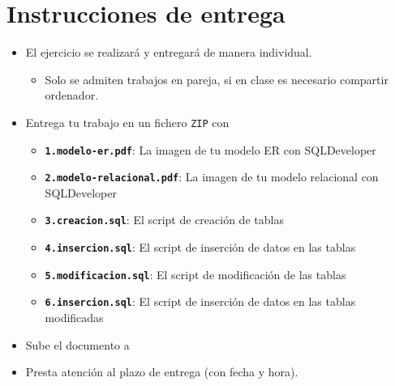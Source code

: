 \section{Instrucciones de entrega}
\begin{itemize}
\item El ejercicio se realizará y entregará de manera individual.
  \begin{itemize}
  \item Solo se admiten trabajos en pareja, si en clase es necesario compartir ordenador.
  \end{itemize}
\item Entrega tu trabajo en un fichero \texttt{ZIP} con
  \begin{itemize}
  \item \texttt{\textbf{1.modelo-er.pdf}}: La imagen de tu modelo ER  con SQLDeveloper
  \item \texttt{\textbf{2.modelo-relacional.pdf}}: La imagen de tu modelo relacional con SQLDeveloper
  \item \texttt{\textbf{3.creacion.sql}}: El script de creación de tablas
  \item \texttt{\textbf{4.insercion.sql}}: El script de inserción de datos en las tablas
  \item \texttt{\textbf{5.modificacion.sql}}: El script de modificación de las tablas
  \item \texttt{\textbf{6.insercion.sql}}: El script de inserción de datos en las tablas modificadas
  \end{itemize}
\item Sube el documento a 
\item Presta atención al plazo de entrega (con fecha y hora).
  
\end{itemize}





